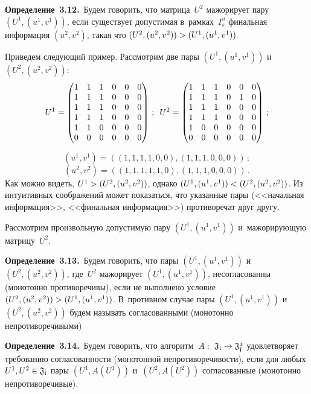 \begin{multicols}{2}
\smallskip

\noindent
\textbf{Определение~3.12.}\ Будем 
говорить, что матрица~$U^2$ мажорирует пару $(U^1,(u^1,v^1))$, если
существует допустимая в~рамках~$I_s^{u}$ финальная информация $(u^2, v^2)$, 
такая что $(U^2, (u^2, v^2))\hm>(U^1, (u^1, v^1)).$

\smallskip

Приведем следующий пример. Рассмотрим две пары $(U^1, (u^1,v^1))$ и~$(U^2, 
(u^2,v^2))$:
$$
U^1 = \begin{pmatrix}  
1 & 1 & 1 & 0 & 0 & 0 \\ 
1 & 1 & 1 & 0 & 0 & 0 \\ 
1 & 1 & 1 & 0 & 0 & 0\\ 
1 & 1 & 1 & 0 & 0 & 0 \\
 1 & 1 & 0 & 0 & 0 & 0 
 \\ 0 & 0 & 0 & 0 & 0 & 0 
 \end{pmatrix}\,;
 \enskip
U^2 = \begin{pmatrix} 
 1 & 1 & 1 & 0 & 0 & 0 
 \\ 1 & 1 & 1 & 0 & 1 & 0
  \\ 1 & 1 & 1 & 0 & 0 & 0\\
   1 & 1 & 1 & 0 & 0 & 0 \\ 
   1 & 0 & 0 & 0 & 0 & 0 \\
    0 & 0 & 0 & 0 & 0 & 0 
    \end{pmatrix}\,;
    $$

$$\left(u^1, v^1\right) =\left( (1,1,1,1,0,0), (1,1,1,0,0,0)\right)\,;
$$
$$\left(u^2, v^2\right) =\left( 
(1,1,1,1,1,0), (1,1,1,0,0,0)\right)\,.
$$ 
Как можно видеть, $U^1 \hm> (U^2, (u^2,v^2))$, 
однако $(U^1, (u^1,v^1)) \hm< (U^2, (u^2,v^2))$. Из интуитивных соображений может 
показаться,  что указанные пары (<<начальная информация>>, <<финальная 
информация>>) противоречат друг другу.

Рассмотрим произвольную допустимую пару $(U^1,(u^1,v^1))$ и~мажорирующую  
матрицу~$U^2$.

\smallskip

\noindent
\textbf{Определение~3.13.}\ Будем 
говорить, что пары $(U^1,(u^1,v^1))$ и~$(U^2,(u^2,v^2))$, где~$U^2$ мажорирует 
$(U^1,(u^1,v^1))$, несогласованны (монотонно противоречивы), если не выполнено 
условие
$(U^2,(u^2,v^2)) \hm> (U^1,(u^1,v^1))$. В~противном случае пары $(U^1,(u^1,v^1))$
и~$(U^2,(u^2,v^2))$ будем называть согласованными (монотонно непротиворечивыми)

\smallskip

\noindent
\textbf{Определение~3.14.}\ Будем 
говорить, что алгоритм~$A:~\mathfrak{J_i} \hm\rightarrow \mathfrak{J_f^1}$  
удовлетворяет требованию согласованности (монотонной непротиворечивости), если 
для любых $ U^1, U^2 \hm\in \mathfrak{J_i}$ пары $(U^1,A(U^1))$ и~$(U^2,A(U^2))$ 
согласованные (монотонно непротиворечивые).


\end{multicols}
